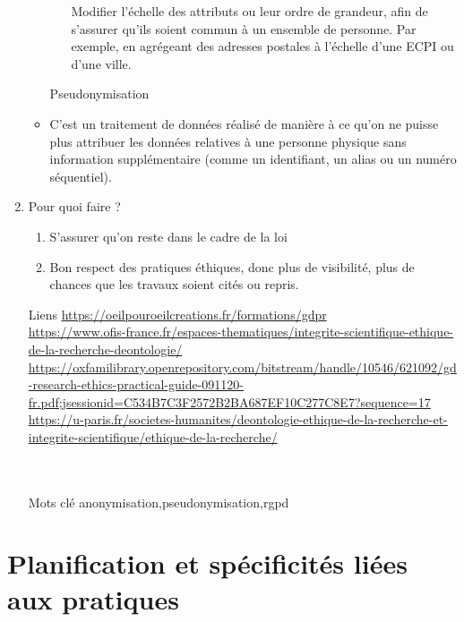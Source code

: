 \documentclass{book}
\begin{document}
\begin{enumerate}
\begin{itemize}
\begin{itemize}
            Modifier l'échelle des attributs ou leur ordre de grandeur, afin de s'assurer qu'ils soient commun à un ensemble de personne. Par exemple, en agrégeant des adresses postales à l'échelle d'une ECPI ou d'une ville. 
        \end{itemize}
        \item [Pseudonymisation]
                \item C'est un traitement de données réalisé de manière à ce qu'on ne puisse plus attribuer les données relatives à une personne physique sans information supplémentaire (comme un identifiant, un alias ou un numéro séquentiel). 
    \end{itemize}
    \item Pour quoi faire ?
        \begin{enumerate}
            \item S'assurer qu'on reste dans le cadre de la loi
            \item Bon respect des pratiques éthiques, donc plus de visibilité, plus de chances que les travaux soient cités ou repris. 
        \end{enumerate}
\end{enumerate}

\begin{itemize}
    \item [Liens]
        \url{https://oeilpouroeilcreations.fr/formations/gdpr}\\
        \url{https://www.ofis-france.fr/espaces-thematiques/integrite-scientifique-ethique-de-la-recherche-deontologie/}\\
        \url{https://oxfamilibrary.openrepository.com/bitstream/handle/10546/621092/gd-research-ethics-practical-guide-091120-fr.pdf;jsessionid=C534B7C3F2572B2BA687EF10C277C8E7?sequence=17}\\
        \url{https://u-paris.fr/societes-humanites/deontologie-ethique-de-la-recherche-et-integrite-scientifique/ethique-de-la-recherche/}\\
        \autocite{delmotte:hal-01940124}\\
        \autocite{bouchetmoneret:hal-03636697}\\
    \item [Mots clé]
        \gls{anonymisation},\gls{pseudonymisation},\gls{rgpd}
\end{itemize}

\section{Planification et spécificités liées aux pratiques}
\end{document}
